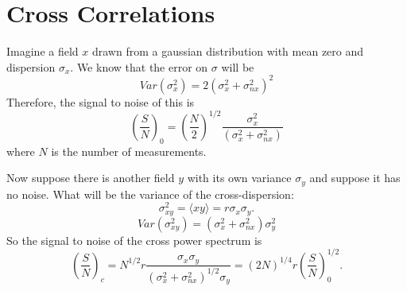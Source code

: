 \documentclass[10pt]{article}
\begin{document}
\newcommand{\problem}[1]{%
\item {#1}
}
\newcommand{\probl}[1]{\label{#1}}
\def\be{\begin{equation}}
\def\ee{\end{equation}}
\def\bea{\begin{eqnarray}}
\def\eea{\end{eqnarray}}
\newcommand{\vs}{\nonumber\\}
\def\across{a^\times}
\def\tcross{T^\times}
\def\ccross{C^\times}
\newcommand{\ec}[1]{Eq.~(\ref{eq:#1})}
\newcommand{\eec}[2]{Eqs.~(\ref{eq:#1}) and (\ref{eq:#2})}
\newcommand{\Ec}[1]{(\ref{eq:#1})}
\newcommand{\eql}[1]{\label{eq:#1}}
\newcommand{\sfig}[2]{
\texttt{[image: \#1]}
        }
\newcommand{\sfigr}[2]{
\texttt{[image: \#1]}
        }
\newcommand{\sfigra}[2]{
\texttt{[image: \#1]}
        }
\newcommand{\Sfig}[2]{
   \begin{figure}[thbp]
   \begin{center}
    \sfig{#1.pdf}{0.5\columnwidth}
    \caption{{\small #2}}
    \label{fig:#1}
     \end{center}
   \end{figure}
}
\newcommand\dirac{\delta_D}
\newcommand{\rf}[1]{\ref{fig:#1}}
\newcommand\rhoc{\rho_{\rm cr}}
\newcommand\zs{D_S}
\newcommand\dts{\Delta t_{\rm Sh}}
\newcommand\zle{D_L}
\newcommand\zsl{D_{SL}}

\newcommand\sy{\sigma_y}
\newcommand\sx{\sigma_x}
\newcommand\xn{\sigma_{nx}}
\section{Cross Correlations}

Imagine a field $x$ drawn from a gaussian distribution with mean zero and dispersion $\sx$. We know that the error on $\sigma$ will be 
\be
Var(\sx^2) = 2(\sx^2 + \xn^2)^2
\ee
Therefore, the signal to noise of this is
\be
\left( \frac{S}{N} \right)_0 = \left(\frac{N}{2}\right)^{1/2}\frac{\sx^2}{(\sx^2 + \xn^2)}
\ee
where $N$ is the number of measurements.

Now suppose there is another field $y$ with its own variance $\sy$ and suppose it has no noise. What will be the variance of the cross-dispersion:
\be
\sigma^2_{xy} = \langle xy\rangle = r\sx\sy
.\ee
\be
Var(\sigma^2_{xy}) = (\sx^2+\xn^2)\sy^2
\ee
So the signal to noise of the cross power spectrum is
\be
\left( \frac{S}{N} \right)_c = N^{1/2}r \frac{\sx\sy}{(\sx^2 + \xn^2)^{1/2} \sy}
= \left({2N}\right)^{1/4} r\left( \frac{S}{N} \right)_0^{1/2}
\eql{sn}
.\ee
\end{document}
